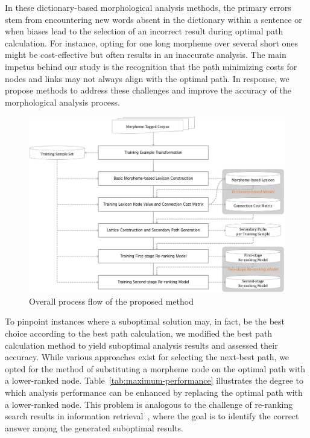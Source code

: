 \documentclass[AMS,STIX2COL]{WileyNJD-v2}
\begin{document}
    In these dictionary-based morphological analysis methods, the primary errors stem from encountering new words absent in the dictionary within a sentence or when biases lead to the selection of an incorrect result during optimal path calculation.
    For instance, opting for one long morpheme over several short ones might be cost-effective but often results in an inaccurate analysis.
    The main impetus behind our study is the recognition that the path minimizing costs for nodes and links may not always align with the optimal path.
    In response, we propose methods to address these challenges and improve the accuracy of the morphological analysis process.

    \begin{figure}[h]
        \centerline{\includegraphics[width=1.0\textwidth]{fig;block-v1}}
        \caption{Overall process flow of the proposed method}
        \label{fig:block}
    \end{figure}

    To pinpoint instances where a suboptimal solution may, in fact, be the best choice according to the best path calculation, we modified the best path calculation method to yield suboptimal analysis results and assessed their accuracy.
    While various approaches exist for selecting the next-best path, we opted for the method of substituting a morpheme node on the optimal path with a lower-ranked node.
    Table~\ref{tab:maximum-performance} illustrates the degree to which analysis performance can be enhanced by replacing the optimal path with a lower-ranked node.
    This problem is analogous to the challenge of re-ranking search results in information retrieval~\cite{BaeYJ2021}, where the goal is to identify the correct answer among the generated suboptimal results.
\end{document}
